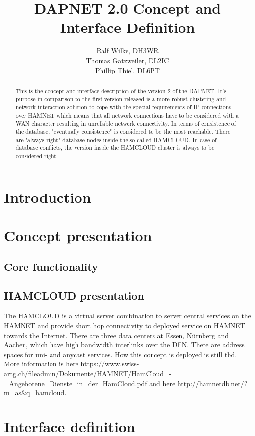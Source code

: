 \documentclass[a4paper]{article}
\title{DAPNET 2.0 Concept and Interface Definition}
\author{
Ralf Wilke, DH3WR\\
Thomas Gatzweiler, DL2IC\\
Phillip Thiel, DL6PT
}
\begin{document}
\maketitle
\begin{abstract}
This is the concept and interface description of the version 2 of the DAPNET. It's purpose in comparison to the first version released is a more robust clustering and network interaction solution to cope with the special requirements of IP connections over HAMNET which means that all network connections have to be considered with a WAN character resulting in unreliable network connectivity. In terms of consistence of the database, "eventually consistence" is considered to be the most reachable. There are "always right" database nodes inside the so called HAMCLOUD. In case of database conflicts, the version inside the HAMCLOUD cluster is always to be considered right.
\end{abstract}

\section{Introduction}
\section{Concept presentation}

\subsection{Core functionality}

\subsection{HAMCLOUD presentation}
The HAMCLOUD is a virtual server combination to server central services on the HAMNET and provide short hop connectivity to deployed service on HAMNET towards the Internet. There are three data centers at Essen, Nürnberg and Aachen, which have high bandwidth interlinks over the DFN. There are address spaces for uni- and anycast services. How this concept is deployed is still tbd.
More information is here \url{https://www.swiss-artg.ch/fileadmin/Dokumente/HAMNET/HamCloud_-_Angebotene_Dienste_in_der_HamCloud.pdf} and here \url{http://hamnetdb.net/?m=as&q=hamcloud}.

\section{Interface definition}
\end{document}
